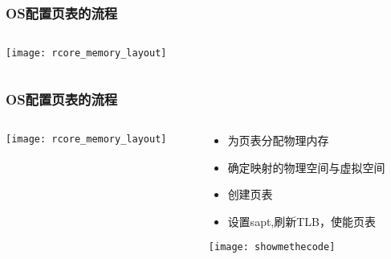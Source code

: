 \begin{frame} 
	\frametitle{OS配置页表的流程}
	
	\begin{columns}
		
		\begin{column}{1.\textwidth}
			\centering
			\texttt{[image: rcore\_memory\_layout]}
			
		\end{column}
		
		
		\begin{column}{.1\textwidth}
			
			
		\end{column}
		
		
	\end{columns}
\end{frame}


\begin{frame} 
	\frametitle{OS配置页表的流程}
	
	\begin{columns}
		
		\begin{column}{.4\textwidth}
			\texttt{[image: rcore\_memory\_layout]}
			
		\end{column}
		
		
		\begin{column}{.6\textwidth}
			
			\begin{itemize}
			\item 为页表分配物理内存 
			\item 确定映射的物理空间与虚拟空间
			\item 创建页表
			\item 设置sapt,刷新TLB，使能页表 \pause
		
			\end{itemize}
			\texttt{[image: showmethecode]}
		\end{column}
		
		
	\end{columns}
\end{frame}


